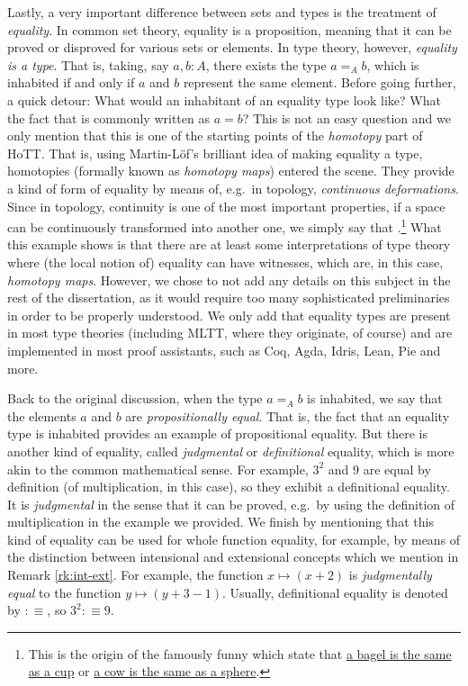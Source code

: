 Lastly, a very important difference between sets and types is the treatment
of \emph{equality}. In common set theory, equality is a proposition, meaning
that it can be proved or disproved for various sets or elements. In type theory,
however, \emph{equality is a type}. That is, taking, say $ a, b : A $, there
exists the type $ a =_A b $, which is inhabited if and only if $ a $ and $ b $
represent the same element. Before going further, a quick detour: What would
an inhabitant of an equality type look like? What  the fact
that is commonly written as $ a = b $? This is not an easy question and we only
mention that this is one of the starting points of the \emph{homotopy} part of
HoTT. That is, using Martin-L\"{o}f's brilliant idea of making equality a type,
homotopies (formally known as \emph{homotopy maps}) entered the scene. They
provide a kind of  form of equality by means of, e.g.\ in topology,
\emph{continuous deformations}. Since in topology, continuity is one of the
most important properties, if a space can be continuously transformed into
another one, we simply say that .\footnote{This is the
  origin of the famously funny  which state that
  \href{https://upload.wikimedia.org/wikipedia/commons/2/26/Mug\_and\_Torus\_morph.gif}{%
    a bagel is the same as a cup} or
  \href{https://upload.wikimedia.org/wikipedia/commons/2/24/Spot\_the\_cow.gif}{%
    a cow is the same as a sphere}.}
What this example shows is that there are at least some interpretations of
type theory where (the local notion of) equality can have witnesses, which
are, in this case, \emph{homotopy maps}. However, we chose to not add any
details on this subject in the rest of the dissertation, as it would require
too many sophisticated preliminaries in order to be properly understood.
We only add that equality types are present in most type theories (including
MLTT, where they originate, of course) and are implemented in most proof assistants,
such as Coq, Agda, Idris, Lean, Pie and more.

Back to the original discussion, when the type $ a =_A b $ is inhabited,
we say that the elements $ a $ and $ b $ are \emph{propositionally equal}.
That is, the fact that an equality type is inhabited provides an example
of propositional equality. But there is another kind of equality, called
\emph{judgmental} or \emph{definitional} equality, which is more akin to the
common mathematical sense. For example, $ 3^2 $ and $ 9 $ are equal by definition
(of multiplication, in this case), so they exhibit a definitional equality.
It is \emph{judgmental} in the sense that it can be proved, e.g.\ by using
the definition of multiplication in the example we provided. We finish by
mentioning that this kind of equality can be used for whole function equality,
for example, by means of the distinction between intensional and extensional
concepts which we mention in Remark \ref{rk:int-ext}. For example,
the function $ x \mapsto (x + 2) $ is \emph{judgmentally equal} to
the function $ y \mapsto (y + 3 - 1) $. Usually, definitional equality is
denoted by $ :\equiv $, so $ 3^2 :\equiv 9 $.


